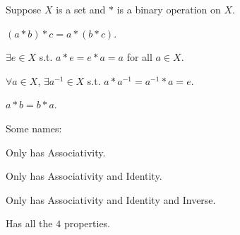 \begin{definition*}
    Suppose \(X\) is a set and \(*\) is a binary operation on \(X\). 
    \begin{definition}[Associativity]
        \((a * b) * c = a * (b *c)\). 
    \end{definition}  
    \begin{definition}[Identity]
        \(\exists e \in X\) s.t. \(a * e = e * a = a\) for all \(a \in X\).   
    \end{definition} 
    \begin{definition}[Inverse]
        \(\forall a \in X\), \(\exists a^{-1} \in X\) s.t. \(a * a^{-1} = a^{-1} * a = e\).   
    \end{definition}
    \begin{definition}[Commutativity]
        \(a * b = b * a\). 
    \end{definition}
\end{definition*}

\begin{definition}
    Some names:
    \begin{definition}[Semigroup]
        Only has Associativity.
    \end{definition}
    \begin{definition}[Monoid]
        Only has Associativity and Identity.
    \end{definition}
    \begin{definition}[Group]
        Only has Associativity and Identity and Inverse.
    \end{definition}
    \begin{definition}
       Has all the \(4\) properties.  
    \end{definition}
\end{definition}